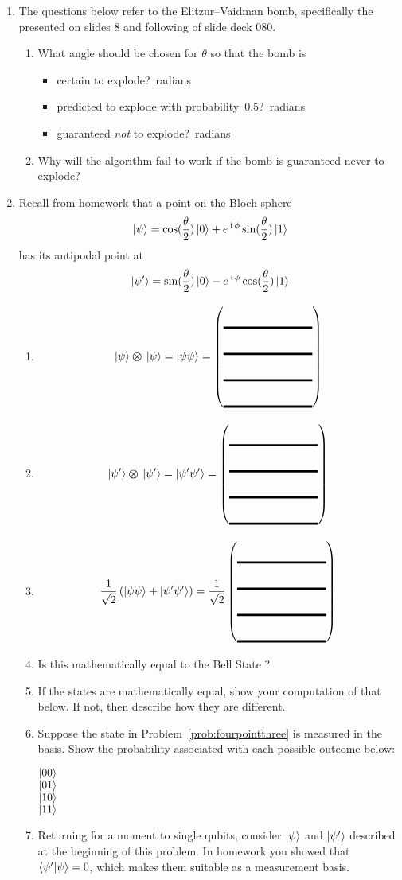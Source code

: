 \documentclass[12pt]{article}
\def\TwoQBlank{%
\DQB{\Blank[8em]}{\Blank[8em]}{\Blank[8em]}{\Blank[8em]}%
}
\begin{document}
\begin{enumerate}
\begin{enumerate}[label=\theenumi.\arabic*]
    \LeaveSpace[2in]{}
\end{enumerate}
\item{} The questions below refer to the Elitzur--Vaidman bomb, specifically the  presented on slides 8 and following of slide deck 080.
\begin{enumerate}[label=\theenumi.\arabic*]
  \item What angle should be chosen for $\theta$ so that the bomb is
  \begin{itemize}
      \item certain to explode?\Blank{}~radians
      \item predicted to explode with probability~0.5?\Blank{}~radians
  \item guaranteed \emph{not} to explode?\Blank{}~radians
  \end{itemize}
  \item Why will the algorithm fail to work if the bomb is guaranteed never to explode?\LeaveSpace{}
\end{enumerate}

\item\label{prob:five} Recall from homework that a point on the Bloch sphere
\[
\ket{\psi} = \cos(\frac{\theta}{2})\ket{0}
    + e^{\,\kern 0.5pt\mathfrak{i}\,\phi}\sin(\frac{\theta}{2})\ket{1}
\]
has its antipodal point at
        \[
        \ket{\psi'}= \sin({\frac{\theta}{2})\ket{0}-e^{\,\kern 0.5pt\mathfrak{i}\,\phi}\cos({\frac{\theta}{2}})\ket{1}}
        \]
\begin{enumerate}[label=\theenumi.\arabic*]
\item \[
\TensProd{\ket{\psi}}{\ket{\psi}} = \ket{\psi\psi} = \TwoQBlank{}
\]
\item \[
\TensProd{\ket{\psi'}}{\ket{\psi'}} = \ket{\psi'\psi'} = \TwoQBlank{}
\]
\item\label{prob:fourpointthree}
\[
\TwoSup{\psi\psi}{\psi'\psi'} = \RootTwo{}\TwoQBlank{}
\]
\item Is this mathematically equal to the Bell State ? \Blank{}
\item If the states are mathematically equal, show your computation of that below.  If not, then describe how they are different.
\LeaveSpace{}
\item Suppose the state in Problem~\ref{prob:fourpointthree} is measured in the \TensProd{\PauliZ}{\PauliZ} basis.  Show the probability associated with each possible outcome below:
\begin{description}
    \item[$\ket{00}$] \Blank[3in]{}
    \item[$\ket{01}$] \Blank[3in]{}
    \item[$\ket{10}$] \Blank[3in]{}
    \item[$\ket{11}$] \Blank[3in]{}
\end{description}
\item\label{prob:matrix} Returning for a moment to single qubits, consider $\ket{\psi}$ and $\ket{\psi'}$ described at the beginning of this problem. In homework you showed that $\braket{\psi'|\psi}=0$, which makes them suitable as a measurement basis.


\end{enumerate}
\end{enumerate}
\end{document}
